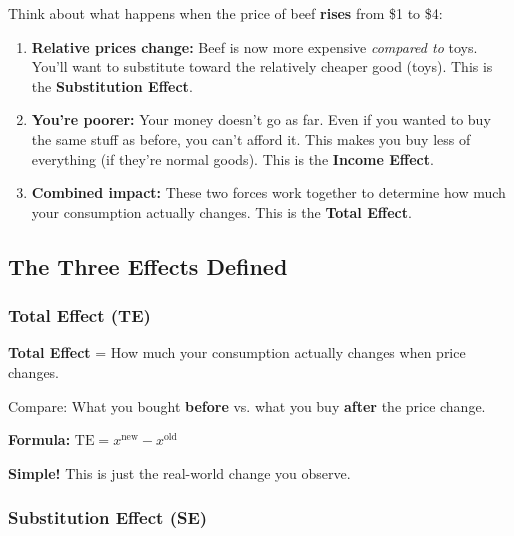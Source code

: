 \documentclass[11pt]{article}
\begin{document}
Think about what happens when the price of beef \textbf{rises} from \$1 to \$4:

\begin{enumerate}[leftmargin=2cm]
    \item \textbf{Relative prices change:} Beef is now more expensive \textit{compared to} toys. You'll want to substitute toward the relatively cheaper good (toys). This is the \textbf{Substitution Effect}.

    \item \textbf{You're poorer:} Your money doesn't go as far. Even if you wanted to buy the same stuff as before, you can't afford it. This makes you buy less of everything (if they're normal goods). This is the \textbf{Income Effect}.

    \item \textbf{Combined impact:} These two forces work together to determine how much your consumption actually changes. This is the \textbf{Total Effect}.
\end{enumerate}

\subsection{The Three Effects Defined}

\subsubsection{Total Effect (TE)}

\begin{center}
\colorbox{yellow!30}{
\begin{minipage}{0.9\textwidth}
\textbf{Total Effect} = How much your consumption actually changes when price changes.

\vspace{0.5em}

Compare: What you bought \textbf{before} vs. what you buy \textbf{after} the price change.
\end{minipage}
}
\end{center}

\textbf{Formula:} $\text{TE} = x^{\text{new}} - x^{\text{old}}$

\textbf{Simple!} This is just the real-world change you observe.

\subsubsection{Substitution Effect (SE)}
\end{document}
